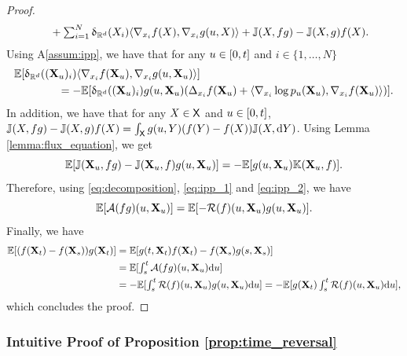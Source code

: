 \begin{proof}
\begin{align}
                      & \qquad \textstyle + \sum_{i=1}^N \updelta_{\mathbb{R}^d}(X_i) \langle \nabla_{x_i} f(X), \nabla_{x_i} g(u,X) \rangle + \mathbb{J}(X, fg) - \mathbb{J}(X, g)f(X). \label{eq:decomposition}
    \end{align}
    Using A\ref{assum:ipp}, we have that for any $u \in [ 0,t ]$ and $i \in \{1, \dots, N\}$
    \begin{align}
      &\mathbb{E}[\updelta_{\mathbb{R}^d}((\mathbf{X}_u)_i) \langle \nabla_{x_i} f(\mathbf{X}_u), \nabla_{x_i} g(u, \mathbf{X}_u) \rangle] \\
      & \qquad \qquad = -  \mathbb{E}[\updelta_{\mathbb{R}^d}((\mathbf{X}_u)_i) g(u, \mathbf{X}_u) (\Delta_{x_i} f(\mathbf{X}_u) + \langle \nabla_{x_i} \log p_u(\mathbf{X}_u), \nabla_{x_i} f(\mathbf{X}_u) \rangle)] . \label{eq:ipp_1}
    \end{align}
    In addition, we have that for any $X \in \mathsf{X}$ and $u \in [ 0,t ]$,
    $\mathbb{J}(X,fg) - \mathbb{J}(X,g)f(X) = \int_{\mathsf{X}} g(u,Y)(f(Y) - f(X)) \mathbb{J}(X, \mathrm{d}
    Y)$. Using Lemma \ref{lemma:flux_equation}, we get
        \begin{equation}
      \mathbb{E}[\mathbb{J}(\mathbf{X}_u, fg) - \mathbb{J}(\mathbf{X}_u,f)g(u,\mathbf{X}_u)] = -\mathbb{E}[g(u,\mathbf{X}_u) \mathbb{K}(\mathbf{X}_u,f)]\textstyle. \label{eq:ipp_2}
    \end{equation}
    Therefore, using \eqref{eq:decomposition}, \eqref{eq:ipp_1} and \eqref{eq:ipp_2}, we have 
    \begin{equation}
      \mathbb{E}[{\mathcal{A}}(fg)(u, \mathbf{X}_u)] = \mathbb{E}[-\mathcal{R}(f)(u, \mathbf{X}_u)g(u, \mathbf{X}_u)]. 
    \end{equation}
    Finally, we have
    \begin{align}
      \mathbb{E}[(f(\mathbf{X}_t) -f(\mathbf{X}_s))g(\mathbf{X}_t)] &= \mathbb{E}[g(t, \mathbf{X}_t)f(\mathbf{X}_t) -f(\mathbf{X}_s)g(s, \mathbf{X}_s)] \\
                                                  &\textstyle = \mathbb{E}[\int_s^t {\mathcal{A}}(fg)(u, \mathbf{X}_u) \mathrm{d} u ] \\
      &\textstyle = - \mathbb{E}[\int_s^t \mathcal{R}(f)(u, \mathbf{X}_u)g(u, \mathbf{X}_u) \mathrm{d} u ] = - \mathbb{E}[g(\mathbf{X}_t) \int_s^t \mathcal{R}(f)(u, \mathbf{X}_u) \mathrm{d} u ] , 
    \end{align}
    which concludes the proof.
  \end{proof}















\subsubsection{Intuitive Proof of Proposition \ref{prop:time_reversal}}
\label{sec:tddm-intuitive_time_reversal}

